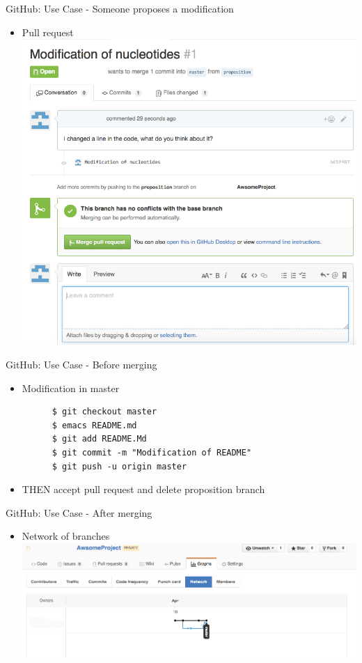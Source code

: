 \begin{frame}[fragile]{GitHub: Use Case - Someone proposes a modification}
  \begin{itemize}
  \item Pull request
    \includegraphics[width=\textwidth]{images/hosting_services_use_case_8.png}
  \end{itemize}
\end{frame}


\begin{frame}[fragile]{GitHub: Use Case - Before merging}
  \begin{itemize}
  \item Modification in master
    \begin{lstlisting}
      $ git checkout master
      $ emacs README.md
      $ git add README.Md
      $ git commit -m "Modification of README"
      $ git push -u origin master
    \end{lstlisting}
  \item THEN accept pull request and delete proposition branch
  \end{itemize}
\end{frame}

\begin{frame}[fragile]{GitHub: Use Case - After merging}
  \begin{itemize}
  \item Network of branches
    \includegraphics[width=\textwidth]{images/hosting_services_use_case_9.png}
  \end{itemize}
\end{frame}


